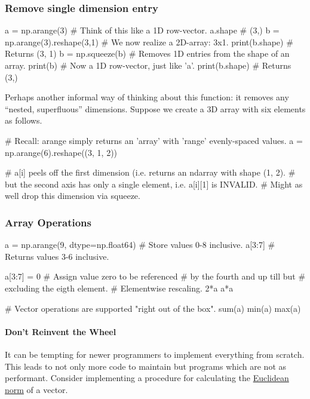 \documentclass[12pt,letterpaper,twoside]{article}
\begin{document}
\subsubsection{Remove single dimension entry}

\begin{python}
a = np.arange(3)   # Think of this like a 1D row-vector.
a.shape            # (3,)
b = np.arange(3).reshape(3,1)  # We now realize a 2D-array: 3x1.
print(b.shape)                 # Returns (3, 1)
b = np.squeeze(b)              # Removes 1D entries from the shape of an array.
print(b)                       # Now a 1D row-vector, just like 'a'.
print(b.shape)                 # Returns (3,)
\end{python}

Perhaps another informal way of thinking about this function: it removes any
``nested, superfluous'' dimensions.  Suppose we create a 3D array with
six elements as follows.

\begin{python}
# Recall: arange simply returns an 'array' with 'range' evenly-spaced values.
a = np.arange(6).reshape((3, 1, 2))

# a[i] peels off the first dimension (i.e. returns an ndarray with shape (1, 2).
# but the second axis has only a single element, i.e. a[i][1] is INVALID. 
# Might as well drop this dimension via squeeze.
\end{python}

\subsubsection{Array Operations}

\begin{python}
a = np.arange(9, dtype=np.float64)   # Store values 0-8 inclusive.
a[3:7]                               # Returns values 3-6 inclusive.

a[3:7] = 0                           # Assign value zero to be referenced 
                                     # by the fourth and up till but
                                     # excluding the eigth element.
# Elementwise rescaling.
2*a
a*a

# Vector operations are supported "right out of the box".
sum(a)
min(a)
max(a)
\end{python}

\paragraph{Don't Reinvent the Wheel} It can be tempting for newer
programmers to implement everything from scratch. This leads to not
only more code to maintain but programs which are not as
performant. Consider implementing a procedure for calculating the 
\href{https://en.wikipedia.org/wiki/Norm_(mathematics)\#Euclidean_norm}
{Euclidean norm} of a vector.
\end{document}
